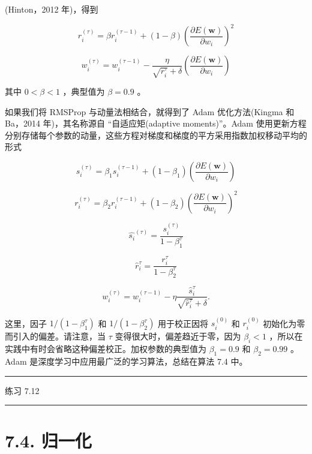 \documentclass[10pt]{report}
\newcommand{\HRule}{\begin{center}\rule{0.9\linewidth}{0.2mm}\end{center}}
\begin{document}
(Hinton，2012 年)，得到

\[
{r}_{i}^{\left( \tau \right) } = \beta {r}_{i}^{\left( \tau  - 1\right) } + \left( {1 - \beta }\right) {\left( \frac{\partial E\left( \mathbf{w}\right) }{\partial {w}_{i}}\right) }^{2} \tag{7.41}
\]

\[
{w}_{i}^{\left( \tau \right) } = {w}_{i}^{\left( \tau  - 1\right) } - \frac{\eta }{\sqrt{{r}_{i}^{\tau }} + \delta }\left( \frac{\partial E\left( \mathbf{w}\right) }{\partial {w}_{i}}\right)  \tag{7.42}
\]

其中 \(0 < \beta  < 1\) ，典型值为 \(\beta  = {0.9}\) 。

如果我们将 RMSProp 与动量法相结合，就得到了 Adam 优化方法(Kingma 和 Ba，2014 年)，其名称源自 “自适应矩(adaptive moments)”。Adam 使用更新方程分别存储每个参数的动量，这些方程对梯度和梯度的平方采用指数加权移动平均的形式

\[
{s}_{i}^{\left( \tau \right) } = {\beta }_{1}{s}_{i}^{\left( \tau  - 1\right) } + \left( {1 - {\beta }_{1}}\right) \left( \frac{\partial E\left( \mathbf{w}\right) }{\partial {w}_{i}}\right)  \tag{7.43}
\]

\[
{r}_{i}^{\left( \tau \right) } = {\beta }_{2}{r}_{i}^{\left( \tau  - 1\right) } + \left( {1 - {\beta }_{2}}\right) {\left( \frac{\partial E\left( \mathbf{w}\right) }{\partial {w}_{i}}\right) }^{2} \tag{7.44}
\]

\[
{\widehat{{s}_{i}}}^{\left( \tau \right) } = \frac{{s}_{i}^{\left( \tau \right) }}{1 - {\beta }_{1}^{\tau }} \tag{7.45}
\]

\[
{\widehat{r}}_{i}^{\tau } = \frac{{r}_{i}^{\tau }}{1 - {\beta }_{2}^{\tau }} \tag{7.46}
\]

\[
{w}_{i}^{\left( \tau \right) } = {w}_{i}^{\left( \tau  - 1\right) } - \eta \frac{{\widehat{s}}_{i}^{\tau }}{\sqrt{{\widehat{r}}_{i}^{\tau }} + \delta }. \tag{7.47}
\]

这里，因子 \(1/\left( {1 - {\beta }_{1}^{\tau }}\right)\) 和 \(1/\left( {1 - {\beta }_{2}^{\tau }}\right)\) 用于校正因将 \({s}_{i}^{\left( 0\right) }\) 和 \({r}_{i}^{\left( 0\right) }\) 初始化为零而引入的偏差。请注意，当 \(\tau\) 变得很大时，偏差趋近于零，因为 \({\beta }_{i} < 1\) ，所以在实践中有时会省略这种偏差校正。加权参数的典型值为 \({\beta }_{1} = {0.9}\) 和 \({\beta }_{2} = {0.99}\) 。Adam 是深度学习中应用最广泛的学习算法，总结在算法 7.4 中。

\HRule

练习 7.12

\HRule

\section*{7.4. 归一化}
\end{document}

